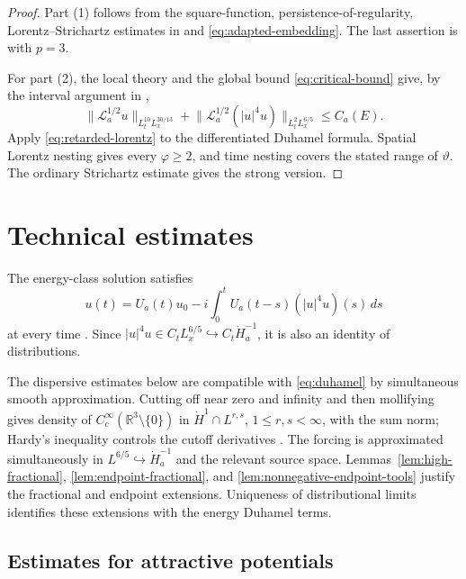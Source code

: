 \documentclass[preprint,12pt]{elsarticle}
\numberwithin{equation}{section}
\theoremstyle{definition}
\theoremstyle{remark}
\newcommand{\R}{\mathbb R}
\newcommand{\cL}{\mathcal L}
\newcommand{\Ham}{\dot H_a^{-1}}
\newcommand{\norm}[2]{\lVert #1\rVert_{#2}}
\begin{document}
\begin{proof}
Part (1) follows from the square-function, persistence-of-regularity,
Lorentz--Strichartz estimates in
\cite[Lemmas~3.1, 3.4, and 3.6]{WangXuZhang} and \eqref{eq:adapted-embedding}. The last assertion is
\cite[Theorem~1.2]{WangXuZhang} with $p=3$.

For part (2), the local theory and the global bound
\eqref{eq:critical-bound} give, by the interval argument in
\cite[Proposition~2.10 and Theorem~2.11]{KillipNLS},
\[
 \norm{\cL_a^{1/2}u}{L_t^{10}L_x^{30/13}}
 +\norm{\cL_a^{1/2}(|u|^4u)}{L_t^2L_x^{6/5}}
 \leq C_a(E).
\]
Apply \eqref{eq:retarded-lorentz} to the differentiated Duhamel
formula. Spatial Lorentz nesting gives every $\varphi\geq2$, and time
nesting covers the stated range of $\vartheta$. The ordinary
Strichartz estimate gives the strong version.
\end{proof}




\section{Technical estimates}

The energy-class solution satisfies
\begin{equation}
 u(t)=U_a(t)u_0-i\int_0^tU_a(t-s)(|u|^4u)(s)\,ds
 \label{eq:duhamel}
\end{equation}
at every time \cite[Section~2]{KillipNLS}. Since
$|u|^4u\in C_tL_x^{6/5}\hookrightarrow C_t\Ham$, it is also an
identity of distributions.

The dispersive estimates below are compatible with
\eqref{eq:duhamel} by simultaneous smooth approximation. Cutting off
near zero and infinity and then mollifying gives density of
$C_c^\infty(\R^3\setminus\{0\})$ in $\dot H^1\cap L^{r,s}$,
$1\leq r,s<\infty$, with the sum norm; Hardy's inequality controls
the cutoff derivatives \cite[Chapter~2]{Ziemer}. The forcing is
approximated simultaneously in $L^{6/5}\hookrightarrow\Ham$ and the
relevant source space. Lemmas~\ref{lem:high-fractional},
\ref{lem:endpoint-fractional}, and
\ref{lem:nonnegative-endpoint-tools} justify the fractional and
endpoint extensions. Uniqueness of distributional limits identifies
these extensions with the energy Duhamel terms.

\subsection{Estimates for attractive potentials}
\end{document}
